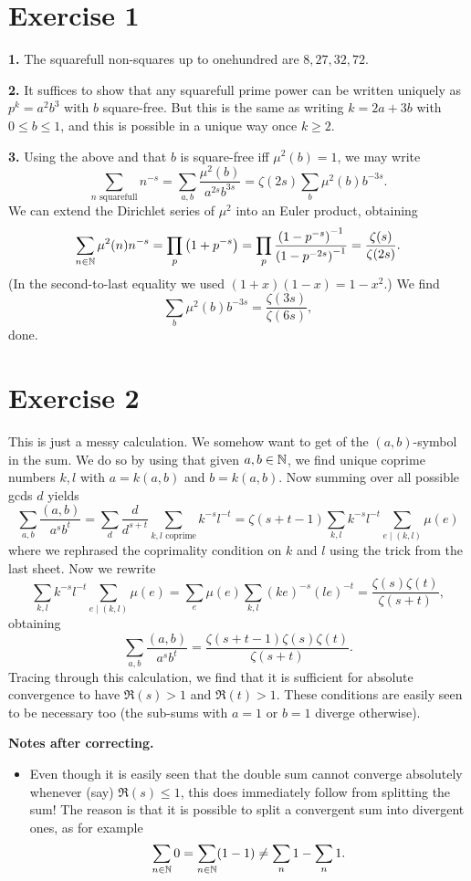 \documentclass[a4paper,11pt]{article}
\begin{document}
\section*{Exercise 1}
\textbf{1.} The squarefull non-squares up to onehundred are $8,27,32,72$.

\textbf{2.} It suffices to show that any squarefull prime power can be written uniquely as
$p^k = a^2 b^3$ with $b$ square-free. But this is the same as writing $k =
2a+3b$ with $0 \leq b \leq 1$, and this is possible in a unique way once $k \geq 2$. 

\textbf{3.} Using the above and that $b$ is square-free iff $\mu^2(b) = 1$, we may write
\[
    \sum_{n \text{ squarefull}} n^{-s} = \sum_{a,b} \frac{\mu^2(b)}{a^{2s} b^{3s}} = \zeta(2s) \sum_{b} \mu^2(b) b^{-3s}.
\]
We can extend the Dirichlet series of $\mu^2$ into an Euler product, obtaining
\[
    \sum_{n \in \mathbb{N}} \mu^2(n)n^{-s} = \prod_p \left(1 + p^{-s} \right) = \prod_p
    \frac {\left(1 - p^{-s}\right)^{-1}} {\left(1 - p^{-2s}\right)^{-1}} =
    \frac {\zeta(s)}{\zeta(2s)}.
\]
(In the second-to-last equality we used $(1+x)(1-x) = 1-x^2$.)
We find 
\[
    \sum_{b} \mu^2(b) b^{-3s} = \frac{\zeta(3s) }{\zeta(6s)},
\]
done.

\section*{Exercise 2}
This is just a messy calculation. 
We somehow want to get of the $(a,b)$-symbol in the sum. We do so by using that
given $a,b \in \mathbb{N}$, we find unique coprime numbers $k, l$ with $a = k (a,b)$ and 
$b = k (a,b)$. Now summing over all possible gcds $d$ yields
\[
    \sum_{a,b} \frac{(a,b)}{a^s b^t} = \sum_{d} \frac d{d^{s+t}} \sum_{k,l
    \text{ coprime}} k^{-s}l^{-t} = \zeta(s+t-1)\sum_{k,l} k^{-s}l^{-t} \sum_{e \mid (k,l)} \mu(e)
\]
where we rephrased the coprimality condition on $k$ and $l$ using the trick
from the last sheet.
Now we rewrite
\[
    \sum_{k,l} k^{-s}l^{-t} \sum_{e \mid (k,l)} \mu(e) = \sum_e \mu(e)
    \sum_{k,l} (ke)^{-s} (le)^{-t} = \frac{\zeta(s)\zeta(t)}{\zeta(s+t)},
\]
obtaining
\[
    \sum_{a,b} \frac{(a,b)}{a^s b^t} = \frac {\zeta(s+t-1) \zeta(s) \zeta(t)}{\zeta(s+t)}.
\]
Tracing through this calculation, we find that it is sufficient for absolute convergence to have
$\Re(s)>1$ and $\Re(t) > 1$. These conditions are easily seen to be necessary too (the sub-sums with 
$a=1$ or $b=1$ diverge otherwise).

\textbf{Notes after correcting.} \leavevmode
\begin{itemize}
    \item Even though it is easily seen that the double sum cannot converge
        absolutely whenever (say) $\Re(s) \leq 1$, this does immediately follow from splitting 
        the sum! The reason is that it is possible to split a convergent sum into divergent 
        ones, as for example
        \[
            \sum_{n \in \mathbb{N}} 0 = \sum_{n \in \mathbb{N}} (1-1) \neq \sum_n 1 - \sum_n 1.
        \]
\end{itemize}
\end{document}
